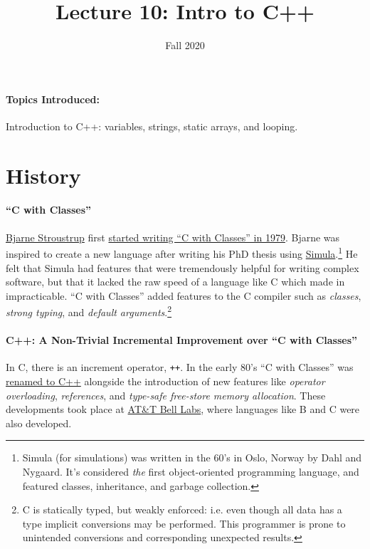 \documentclass[12pt,letterpaper,twoside]{article}
\begin{document}
\title{Lecture 10: Intro to C++\vspace{-5ex}}
\date{Fall 2020}
\maketitle

{\footnotesize
\paragraph{Topics Introduced:} Introduction to C++: variables,
strings, static arrays, and looping.
}
\vspace{-3ex}
\section{History}
\vspace{-2.5ex}
\paragraph{``C with Classes''}
\href{https://en.wikipedia.org/wiki/Bjarne_Stroustrup}{Bjarne
  Stroustrup} first
\href{https://en.wikipedia.org/wiki/C%2B%2B#History}{started writing ``C with Classes'' in 1979}. 
  Bjarne was inspired to create a new language after writing his PhD
  thesis using
  \href{https://en.wikipedia.org/wiki/Simula}{Simula}.\footnote{Simula
    (for simulations)
    was written in the 60's in Oslo, Norway by Dahl and Nygaard. It's
    considered \emph{the} first object-oriented programming language,
    and featured classes, inheritance, and garbage collection.} He felt that Simula
  had features that were tremendously helpful for
  writing complex software, but that it lacked the raw speed of a language
  like C which made in impracticable.
  ``C with Classes'' added features to the C compiler such as
  \emph{classes}, \emph{strong typing}, and \emph{default
    arguments}.\footnote{C is statically typed, but weakly enforced:
    i.e. even though all data has a type
    implicit conversions may be performed. This programmer is prone to unintended
    conversions
    and corresponding unexpected results.}

  \paragraph{C++: A Non-Trivial Incremental Improvement over ``C with Classes''}
  In C, there is an increment operator, \texttt{++}. In
  the early 80's ``C with Classes'' was
  \href{https://en.wikipedia.org/wiki/The_C\%2B\%2B_Programming_Language}{renamed to C++}
  alongside the introduction of new features like \emph{operator overloading},
  \emph{references}, and \emph{type-safe free-store memory allocation}. These
  developments took place at
  \href{https://en.wikipedia.org/wiki/Bell_Labs}{AT\&T Bell Labs},
  where languages
  like B and C were also developed.
\end{document}

